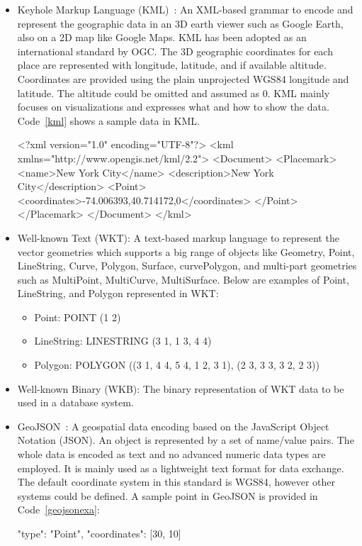 \documentclass[a4paper,12pt]{article}
\begin{document}
\begin{itemize}
\item Keyhole Markup Language (KML)~\cite{kml}: An XML-based grammar to encode and represent the geographic data in an 3D earth viewer such as Google Earth, also on a 2D map like Google Maps. KML has been adopted as an international standard by OGC. The 3D geographic coordinates for each place are represented with longitude, latitude, and if available altitude. Coordinates are provided using the plain unprojected WGS84 longitude and latitude. The altitude could be omitted and assumed as $0$. KML mainly focuses on visualizations and expresses what and how to show the data. Code~\ref{kml} shows a sample data in KML. 
\vspace{10px}
\begin{fakeXML}[label=kml,caption=A simple KML example representing a Point]
<?xml version="1.0" encoding="UTF-8"?>
<kml xmlns="http://www.opengis.net/kml/2.2">
<Document>
<Placemark>
  <name>New York City</name>
  <description>New York City</description>
  <Point>
    <coordinates>-74.006393,40.714172,0</coordinates>
  </Point>
</Placemark>
</Document>
</kml>
\end{fakeXML} 
\vspace{10px}
\item Well-known Text (WKT): A text-based markup language to represent the vector geometries which supports a big range of objects like Geometry, Point, LineString, Curve, Polygon, Surface, curvePolygon, and multi-part geometries such as MultiPoint, MultiCurve, MultiSurface. Below are examples of Point, LineString, and Polygon represented in WKT: 
\begin{itemize}
\item Point: POINT (1 2)
\item LineString: LINESTRING (3 1, 1 3, 4 4)
\item Polygon: POLYGON ((3 1, 4 4, 5 4, 1 2, 3 1),
			(2 3, 3 3, 3 2, 2 3))
\end{itemize}
\item Well-known Binary (WKB): The binary representation of WKT data to be used in a database system.
\item GeoJSON~\cite{www/geojson}: A geospatial data encoding based on the JavaScript Object Notation (JSON). An object is represented by a set of name/value pairs. The whole data is encoded as text and no advanced numeric data types are employed. It is mainly used as a lightweight text format for data exchange. The default coordinate system in this standard is WGS84, however other systems could be defined. A sample point in GeoJSON is provided in Code~\ref{geojsonexa}:
\vspace{10px} 
\begin{fakeXML}[label=geojsonexa,caption=A simple GeoJSON example representing a Point]
{
    "type": "Point", 
    "coordinates": [30, 10]
}
\end{fakeXML}
\end{itemize}
\vspace{10px}
\end{document}
